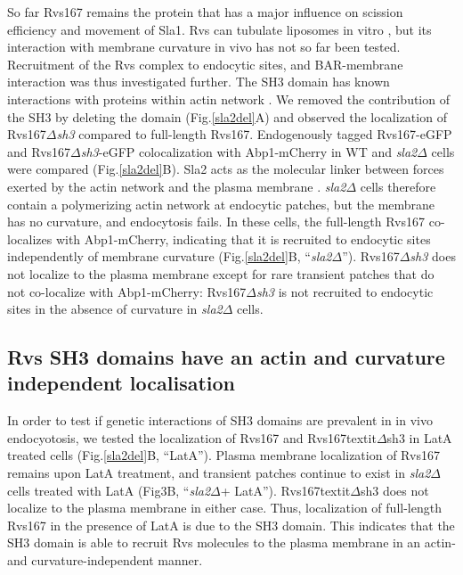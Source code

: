 \documentclass[9pt,lineno]{elife}
\begin{document}
So far Rvs167 remains the protein that has a major influence on scission efficiency and movement of Sla1. Rvs can tubulate liposomes in vitro \cite{Youn2010}, but its interaction with membrane curvature in vivo has not so far been tested.  Recruitment of the Rvs complex to endocytic sites, and BAR-membrane interaction was thus investigated further. The SH3 domain has known interactions with proteins within actin network \cite{Lila1997,Colwill1999,Madania1999,Liu2009}. We removed the contribution of the SH3 by deleting the domain (Fig.\ref{sla2del}A) and observed the localization of Rvs167\textit{$\Delta$sh3} compared to full-length Rvs167. Endogenously tagged Rvs167-eGFP and Rvs167\textit{$\Delta$sh3}-eGFP colocalization with Abp1-mCherry in WT and \textit{sla2$\Delta$} cells were compared (Fig.\ref{sla2del}B). Sla2 acts as the molecular linker between forces exerted by the actin network and the plasma membrane \cite{Skruzny2012}. \textit{sla2$\Delta$} cells therefore contain a polymerizing actin network at endocytic patches, but the membrane has no curvature, and endocytosis fails. In these cells, the full-length Rvs167 co-localizes with Abp1-mCherry, indicating that it is recruited to endocytic sites independently of membrane curvature (Fig.\ref{sla2del}B, “\textit{sla2$\Delta$}”). Rvs167\textit{$\Delta$sh3} does not localize to the plasma membrane except for rare transient patches that do not co-localize with Abp1-mCherry: Rvs167\textit{$\Delta$sh3} is not recruited to endocytic sites in the absence of curvature in \textit{sla2$\Delta$} cells.


\subsection{Rvs SH3 domains have an actin and curvature independent localisation}
In order to test if genetic interactions of SH3 domains are prevalent in in vivo endocyotosis, we tested the localization of Rvs167 and Rvs167textit{$\Delta$sh3} in LatA treated cells (Fig.\ref{sla2del}B, “LatA”). Plasma membrane localization of Rvs167 remains upon LatA treatment, and transient patches continue to exist in \textit{sla2$\Delta$} cells treated with LatA (Fig3B, “\textit{sla2$\Delta$}+ LatA”). Rvs167textit{$\Delta$sh3} does not localize to the plasma membrane in either case. Thus, localization of full-length Rvs167 in the presence of LatA is due to the SH3 domain. This indicates that the SH3 domain is able to recruit Rvs molecules to the plasma membrane in an actin- and curvature-independent manner. 
\end{document}
